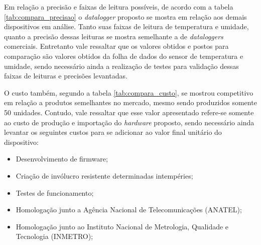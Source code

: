 Em relação a precisão e faixas de leitura possíveis, de acordo com a tabela \ref{tab:compara_precisao} o \textit{datalogger} proposto se mostra em relação aos demais dispositivos em análise. Tanto suas faixas de leitura de temperatura e umidade, quanto a precisão dessas leituras se mostra semelhante a de \textit{dataloggers} comerciais. Entretanto vale ressaltar que os valores obtidos e postos para comparação são valores obtidos da folha de dados do sensor de temperatura e umidade, sendo necessário ainda a realização de testes para validação dessas faixas de leituras e precisões levantadas. 
\newpage
\begin{table}[!h]
	
	\captionsetup{width=7cm}%
    \end{table}

O custo também, segundo a tabela \ref{tab:compara_custo}, se mostrou competitivo em relação a produtos semelhantes no mercado, mesmo sendo produzidos somente 50 unidades. Contudo, vale ressaltar que esse valor apresentado refere-se somente ao custo de produção e importação do \textit{hardware} proposto, sendo necessário ainda levantar os seguintes custos para se adicionar ao valor final unitário do dispositivo:

\begin{itemize}
    \item Desenvolvimento de firmware;
    \item Criação de invólucro resistente determinadas intempéries;
    \item Testes de funcionamento;
    \item Homologação junto a Agência Nacional de Telecomunicações (ANATEL);
    \item Homologação junto ao Instituto Nacional de Metrologia, Qualidade e Tecnologia (INMETRO);
    
\end{itemize}




